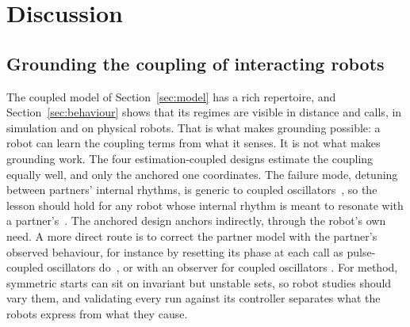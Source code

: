 \documentclass[journal]{IEEEtran}
\newif\ifdraftmarkers
\newcommand{\citeneeded}[1]{\ifdraftmarkers\textcolor{red}{[CITE:~#1]}\addtocontents{cnd}{\protect\item #1}\fi}
\begin{document}
\begin{table}[t]
\centering
\caption{Reading the attachment parameters from behaviour. Stand-in CV: five-fold cross-validation by seed on the stand-in; Gazebo transfer: trained on the stand-in, tested on the 176 Gazebo runs; Gazebo CV: within the Gazebo runs, folds by seed.}
\label{tab:inverse}
\footnotesize
\setlength{\tabcolsep}{3pt}
\resizebox{\columnwidth}{!}{}
\end{table}

\section{Discussion}
\label{sec:discussion}

\subsection{Grounding the coupling of interacting robots}
The coupled model of Section~\ref{sec:model} has a rich repertoire, and Section~\ref{sec:behaviour} shows that its regimes are visible in distance and calls, in simulation and on physical robots. That is what makes grounding possible: a robot can learn the coupling terms from what it senses. It is not what makes grounding work. The four estimation-coupled designs estimate the coupling equally well, and only the anchored one coordinates. The failure mode, detuning between partners' internal rhythms, is generic to coupled oscillators~\cite{Kelso1995,Ermentrout2019}, so the lesson should hold for any robot whose internal rhythm is meant to resonate with a partner's~\cite{Lomas2022resonance}. The anchored design anchors indirectly, through the robot's own need. A more direct route is to correct the partner model with the partner's observed behaviour, for instance by resetting its phase at each call as pulse-coupled oscillators do~\cite{Mirollo1990}, or with an observer for coupled oscillators \citeneeded{state estimation / observers for coupled oscillators}. For method, symmetric starts can sit on invariant but unstable sets, so robot studies should vary them, and validating every run against its controller separates what the robots express from what they cause.
\end{document}
